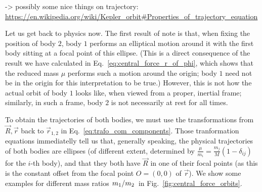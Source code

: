 \documentclass[../class_mech_main.tex]{subfiles}
\begin{document}


-> possibly some nice things on trajectory: \url{https://en.wikipedia.org/wiki/Kepler_orbit#Properties_of_trajectory_equation}



Let us get back to physics now. The first result of note is that, when fixing the position of body $2$, body $1$ performs an elliptical motion around it with the first body sitting at a focal point of this ellipse. (This is a direct consequence of the result we have calculated in Eq.~\eqref{eq:central_force_r_of_phi}, which shows that the reduced mass $\mu$ performs such a motion around the origin; body $1$ need not be in the origin for this interpretation to be true.) However, this is not how the actual orbit of body $1$ looks like, when viewed from a proper, inertial frame; similarly, in such a frame, body $2$ is not necessarily at rest for all times.

To obtain the trajectories of both bodies, we must use the transformations from $\vec{R}, \vec{r}$ back to $\vec{r}_{1, 2}$ in Eq.~\eqref{eq:trafo_com_components}. Those tranformation equations immediatelly tell us that, generally speaking, the physical trajectories of both bodies are ellipses (of different extent, determined by $\frac{\mu}{m_i} = \frac{m_j}{M} (1 - \delta_{ij})$ for the $i$-th body), and that they both have $\vec{R}$ in one of their focal points (as this is the constant offset from the focal point $O = (0, 0)$ of $\vec{r}$). We show some examples for different mass ratios $\flatfrac{m_1}{m_2}$ in Fig.~\ref{fig:central_force_orbits}.




\end{document}
